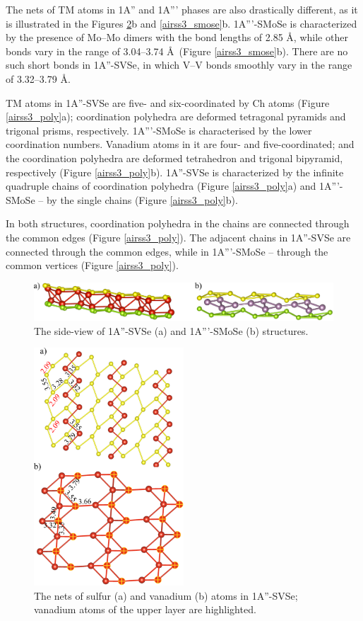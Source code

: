 \documentclass[a4paperm]{article}
\begin{document}
The nets of TM atoms in 1A'' and 1A''' phases are also drastically different, as it is illustrated in the Figures \ref{airss3_svse}b and \ref{airss3_smose}b.
1A'''-SMoSe is characterized by the presence of Mo--Mo dimers with the bond lengths of 2.85 \AA, while other bonds vary in the range of 3.04--3.74 \AA\ (Figure \ref{airss3_smose}b).
There are no such short bonds in 1A''-SVSe, in which V--V bonds smoothly vary in the range of 3.32--3.79 \AA.

TM atoms in 1A''-SVSe are five- and six-coordinated by Ch atoms (Figure \ref{airss3_poly}a);
coordination polyhedra are deformed tetragonal pyramids and trigonal prisms, respectively.
1A'''-SMoSe is characterised by the lower coordination numbers.
Vanadium atoms in it are four- and five-coordinated; and the coordination polyhedra are deformed tetrahedron and trigonal bipyramid, respectively (Figure \ref{airss3_poly}b).
1A''-SVSe is characterized by the infinite quadruple chains of coordination polyhedra (Figure \ref{airss3_poly}a) and 1A'''-SMoSe -- by the single chains (Figure \ref{airss3_poly}b).

In both structures, coordination polyhedra in the chains are connected through the common edges (Figure \ref{airss3_poly}).
The adjacent chains in 1A''-SVSe are connected through the common edges, while in 1A'''-SMoSe -- through the common vertices (Figure \ref{airss3_poly}).

\begin{figure}[H]
	\includegraphics[width=\textwidth]{airss3_side.png}
	\caption{The side-view of 1A''-SVSe (a) and 1A'''-SMoSe (b) structures.}
	\label{airss3_side}
\end{figure}

\begin{figure}[H]
	\includegraphics[width=0.5\textwidth]{airss3_svse.png}
	\caption{The nets of sulfur (a) and vanadium (b) atoms in 1A''-SVSe; vanadium atoms of the upper layer are highlighted.}
	\label{airss3_svse}
\end{figure}
\end{document}
